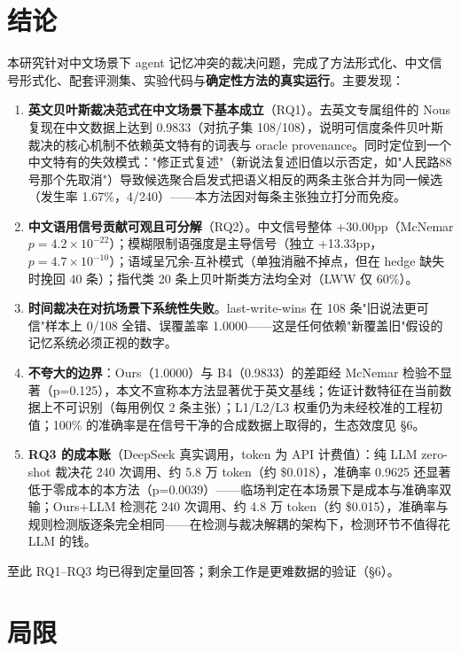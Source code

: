 \documentclass{article}
\begin{document}
\section{结论}

本研究针对中文场景下 agent 记忆冲突的裁决问题，完成了方法形式化、中文信号形式化、配套评测集、实验代码与\textbf{确定性方法的真实运行}。主要发现：


\begin{enumerate}
\item \textbf{英文贝叶斯裁决范式在中文场景下基本成立}（RQ1）。去英文专属组件的 Nous 复现在中文数据上达到 0.9833（对抗子集 108/108），说明可信度条件贝叶斯裁决的核心机制不依赖英文特有的词表与 oracle provenance。同时定位到一个中文特有的失效模式："修正式复述"（新说法复述旧值以示否定，如"人民路88号那个先取消"）导致候选聚合启发式把语义相反的两条主张合并为同一候选（发生率 1.67\%，4/240）——本方法因对每条主张独立打分而免疫。
\item \textbf{中文语用信号贡献可观且可分解}（RQ2）。中文信号整体 +30.00pp（McNemar $p=4.2\times 10^{-22}$）；模糊限制语强度是主导信号（独立 +13.33pp，$p=4.7\times 10^{-10}$）；语域呈冗余-互补模式（单独消融不掉点，但在 hedge 缺失时挽回 40 条）；指代类 20 条上贝叶斯类方法均全对（LWW 仅 60\%）。
\item \textbf{时间裁决在对抗场景下系统性失败}。last-write-wins 在 108 条"旧说法更可信"样本上 0/108 全错、误覆盖率 1.0000——这是任何依赖"新覆盖旧"假设的记忆系统必须正视的数字。
\item \textbf{不夸大的边界}：Ours（1.0000）与 B4（0.9833）的差距经 McNemar 检验不显著（p=0.125），本文不宣称本方法显著优于英文基线；佐证计数特征在当前数据上不可识别（每用例仅 2 条主张）；L1/L2/L3 权重仍为未经校准的工程初值；100\% 的准确率是在信号干净的合成数据上取得的，生态效度见 §6。
\item \textbf{RQ3 的成本账}（DeepSeek 真实调用，token 为 API 计费值）：纯 LLM zero-shot 裁决花 240 次调用、约 5.8 万 token（约 \$0.018），准确率 0.9625 还显著低于零成本的本方法（p=0.0039）——临场判定在本场景下是成本与准确率双输；Ours+LLM 检测花 240 次调用、约 4.8 万 token（约 \$0.015），准确率与规则检测版逐条完全相同——在检测与裁决解耦的架构下，检测环节不值得花 LLM 的钱。
\end{enumerate}

至此 RQ1–RQ3 均已得到定量回答；剩余工作是更难数据的验证（§6）。


\section{局限}
\end{document}
